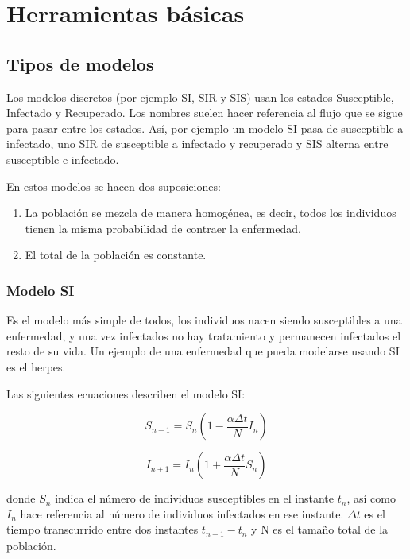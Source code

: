 \chapter{Herramientas básicas}

\section{Tipos de modelos}

Los modelos discretos (por ejemplo SI, SIR y SIS) usan los estados Susceptible, Infectado y Recuperado. Los nombres suelen hacer referencia al flujo que se sigue para pasar entre los estados. Así, por ejemplo un modelo SI pasa de susceptible a infectado, uno SIR de susceptible a infectado y recuperado y SIS alterna entre susceptible e infectado.

En estos modelos se hacen dos suposiciones:
\begin{enumerate}
\item La población se mezcla de manera homogénea, es decir, todos los individuos tienen la misma probabilidad de contraer la enfermedad.
\item El total de la población es constante.
\end{enumerate}

\subsection{Modelo SI}
Es el modelo más simple de todos, los individuos nacen siendo susceptibles a una enfermedad, y una vez infectados no hay tratamiento y permanecen infectados el resto de su vida.
Un ejemplo de una enfermedad que pueda modelarse usando SI es el herpes.

Las siguientes ecuaciones describen el modelo SI:

\begin{equation}
\label{eqn: SI_S}
S_{n+1}=S_n\left( 1-\frac{\alpha\Delta t}{N}I_n\right)
\end{equation}

\begin{equation}
\label{eqn: SI_I}
I_{n+1}=I_n\left( 1+\frac{\alpha\Delta t}{N}S_n\right)
\end{equation}

donde $S_n$ indica el número de individuos susceptibles en el instante $t_n$, así como $I_n$ hace referencia al número de individuos infectados en ese instante. $\Delta t$ es el tiempo transcurrido entre dos instantes $t_{n+1}-t_n$ y N es el tamaño total de la población.

